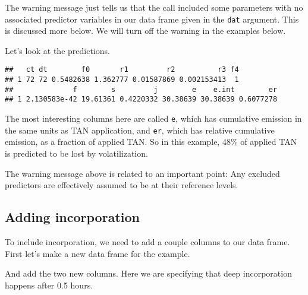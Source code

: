 \documentclass{article}
\begin{document}
The warning message just tells us that the call included some parameters with no associated predictor variables in our data frame given in the \texttt{dat} argument.
This is discussed more below.
We will turn off the warning in the examples below.

Let's look at the predictions.

\begin{knitrout}
\color{fgcolor}\begin{kframe}
\begin{alltt}
\end{alltt}
\begin{verbatim}
##   ct dt        f0       r1         r2          r3 f4
## 1 72 72 0.5482638 1.362777 0.01587869 0.002153413  1
##              f        s         j        e    e.int        er
## 1 2.130583e-42 19.61361 0.4220332 30.38639 30.38639 0.6077278
\end{verbatim}
\end{kframe}
\end{knitrout}

The most interesting columns here are called \texttt{e}, which has cumulative emission in the same units as TAN application, and \texttt{er}, which has relative cumulative emission, as a fraction of applied TAN.
So in this example, 48\% of applied TAN is predicted to be lost by volatilization.

The warning message above is related to an important point: Any excluded predictors are effectively assumed to be at their reference levels.

\subsection{Adding incorporation}
To include incorporation, we need to add a couple columns to our data frame.
First let's make a new data frame for the example.

\begin{knitrout}
\color{fgcolor}\begin{kframe}
\begin{alltt}
 \hlkwb{<-} 
\end{alltt}
\end{kframe}
\end{knitrout}

And add the two new columns.
Here we are specifying that deep incorporation happens after 0.5 hours.
\end{document}
